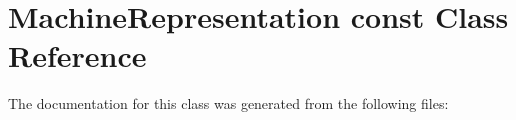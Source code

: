 \hypertarget{classMachineRepresentation_01const}{}\section{Machine\+Representation const Class Reference}
\label{classMachineRepresentation_01const}


The documentation for this class was generated from the following files\+: